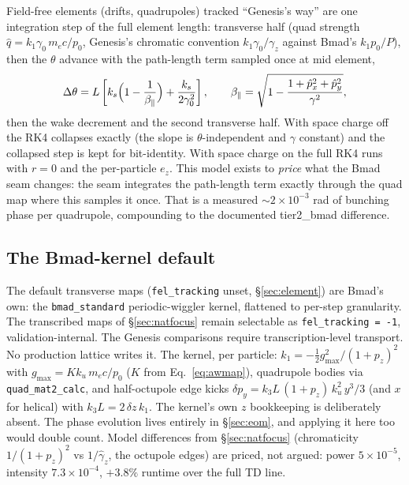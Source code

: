 \documentclass[11pt]{article}
\newcommand{\code}[1]{\texttt{#1}}
\begin{document}
Field-free elements (drifts, quadrupoles) tracked ``Genesis's way'' are one
integration step of the full element length: transverse half (quad strength
$\hat q = k_1\gamma_0\, m_ec/p_0$, Genesis's chromatic convention $k_1\gamma_0/
\gamma_z$ against Bmad's $k_1 p_0/P$), then the $\theta$ advance with the path-length
term sampled once at mid element,
\begin{equation}\label{eq:interludetheta}
  \Delta\theta = L\left[k_s\Bigl(1-\frac{1}{\beta_{\parallel}}\Bigr)
   + \frac{k_s}{2\gamma_0^2}\right],\qquad
  \beta_\parallel = \sqrt{1 - \frac{1 + \hat p_x^2 + \hat p_y^2}{\gamma^2}},
\end{equation}
then the wake decrement and the second transverse half. With space charge off the RK4
collapses exactly (the slope is $\theta$-independent and $\gamma$ constant) and the
collapsed step is kept for bit-identity. With space charge on the full RK4 runs with
$r=0$ and the per-particle $e_z$. This model exists to \emph{price} what the Bmad seam
changes: the seam integrates the path-length term exactly through the quad map where
this samples it once. That is a measured $\sim\!2\times10^{-3}$ rad of bunching phase
per quadrupole, compounding to the documented tier2\_bmad difference.

\subsection{The Bmad-kernel default}\label{sec:undbmad}

The default transverse maps (\code{fel\_tracking} unset, \S\ref{sec:element}) are
Bmad's own: the \code{bmad\_standard} periodic-wiggler kernel, flattened to per-step
granularity. The transcribed maps of \S\ref{sec:natfocus} remain selectable as
\code{fel\_tracking = -1}, validation-internal. The Genesis comparisons require
transcription-level transport. No production lattice writes it. The kernel, per
particle: $k_1 = -\tfrac12 g_{\max}^2/
(1+p_z)^2$ with $g_{\max} = K k_u\,m_ec/p_0$ ($K$ from Eq.~\ref{eq:awmap}), quadrupole
bodies via \code{quad\_mat2\_calc}, and half-octupole edge kicks
$\delta p_y = k_3 L\,(1{+}p_z)\, k_u^2\, y^3/3$ (and $x$ for helical) with
$k_3 L = 2\,\delta z\, k_1$. The kernel's own $z$ bookkeeping is deliberately absent.
The phase evolution lives entirely in \S\ref{sec:eom}, and applying it here too
would double count. Model differences from \S\ref{sec:natfocus} (chromaticity
$1/(1+p_z)^2$ vs $1/\hat\gamma_z$, the octupole edges) are priced, not argued: power
$5\times10^{-5}$, intensity $7.3\times10^{-4}$, $+3.8\%$ runtime over the full TD
line.
\end{document}
